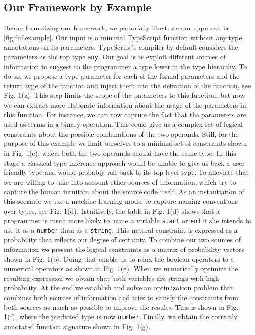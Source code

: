\documentclass[sigplan,10pt,anonymous]{acmart} %
\newcommand{\margincomment}[2]{\marginpar{\scriptsize\color{Maroon}#1 says: #2}}
\newcommand{\adg}[1]{\margincomment{ADG}{#1}}
\theoremstyle{plain}
\theoremstyle{remark}
\theoremstyle{definition}
\begin{document}
\subsection{Our Framework by Example}\adg{revisit this text once the figure stabilises}
Before formalizing our framework, we pictorially illustrate our approach in \cref{fig:fullexample}.
Our input is a minimal TypeScript function without any type annotations on its parameters.
TypeScript's compiler by default considers the parameters as the top type \texttt{any}.
Our goal is to exploit different sources of information to suggest to the programmer
a type lower in the type hierarchy.
To do so, we propose a type parameter for each of the formal parameters
and the return type of the function
and inject them into the definition of the function, see Fig. 1(a).
This step limits the scope of the parameters to this function, but
now we can extract more elaborate information about the usage of the
parameters in this function.
For instance, we can now capture the
fact that the parameters are used as terms in a binary operation.
This could give us a complex set of logical constraints about the possible combinations of the two operands.
Still, for the purpose of this example we limit ourselves to a minimal set of constraints shown in Fig. 1(c),
where both the two operands should have the same type.
In this stage a classical type inference approach would be unable to give us back a user-friendly type
and would probably roll back to its top-level type.
To alleviate that we are willing to take into account other sources of information,
which try to capture the human intuition about the source code itself.
As an instantiation of this scenario we use a machine learning model to capture naming conventions over types,
see Fig. 1(d).
Intuitively, the table in Fig. 1(d) shows that a programmer
is much more likely to name a variable \texttt{start} or \texttt{end}
if she intends to use it as a \texttt{number} than as a \texttt{string}.
This natural constraint is expressed as a probability that reflects our degree of certainty.
To combine our two sources of information we present the logical constraints
as a matrix of probability vectors shown in Fig. 1(b).
Doing that enable us to relax the boolean operators to a numerical
operators as shown in Fig. 1(e).
When we numerically optimize the resulting expression
we obtain that both variables are strings with high probability.
At the end we establish and solve an optimization problem that combines both sources of information
and tries to satisfy the constraints from both sources as much as possible to improve the results.
This is shown in Fig. 1(f), where the predicted type is now \texttt{number}.
Finally, we obtain the correctly annotated function signature shown in Fig. 1(g).
\end{document}
